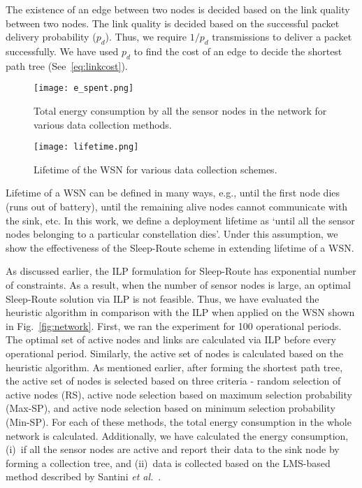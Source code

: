 \documentclass[conference]{IEEEtran}
\begin{document}
The existence of an edge between two nodes is decided based on the link quality between two nodes. The link quality is decided based on the successful packet delivery probability ($p_d$). Thus, we require $1/p_d$ transmissions to deliver a packet successfully. We have used $p_d$ to find the cost of an edge to decide the shortest path tree (See~\ref{eq:linkcost}).
\begin{figure}[]
	\centering
	\texttt{[image: e\_spent.png]}
	\caption{Total energy consumption by all the sensor nodes in the network for various data collection methods.}
	\label{fig:e_spent}
\end{figure}
\begin{figure}[]
	\centering
	\texttt{[image: lifetime.png]}
	\caption{Lifetime of the WSN for various data collection schemes.}
	\label{fig:lifetime}
\end{figure}

Lifetime of a WSN can be defined in many ways, e.g., until the first node dies (runs out of battery), until the remaining alive nodes cannot communicate with the sink, etc. In this work, we define a deployment lifetime as `until all the sensor nodes belonging to a particular constellation dies'. Under this assumption, we show the effectiveness of the Sleep-Route scheme in extending lifetime of a WSN.

As discussed earlier, the ILP formulation for Sleep-Route has exponential number of constraints. As a result, when the number of sensor nodes is large, an optimal Sleep-Route solution via ILP is not feasible. Thus, we have evaluated the heuristic algorithm in comparison with the ILP when applied on the WSN shown in Fig.~\ref{fig:network}. First, we ran the experiment for 100 operational periods. The optimal set of active nodes and links are calculated via ILP before every operational period. Similarly, the active set of nodes is calculated based on the heuristic algorithm. As mentioned earlier, after forming the shortest path tree, the active set of nodes is selected based on three criteria - random selection of active nodes (RS), active node selection based on maximum selection probability (Max-SP), and active node selection based on minimum selection probability (Min-SP).  For each of these methods, the total energy consumption in the whole network is calculated. Additionally, we have calculated the energy consumption, (i)~if all the sensor nodes are active and report their data to the sink node by forming a collection tree, and (ii)~data is collected based on the LMS-based method described by Santini {\it et al.}~\cite{santini2006adaptive}. 
 
\end{document}
